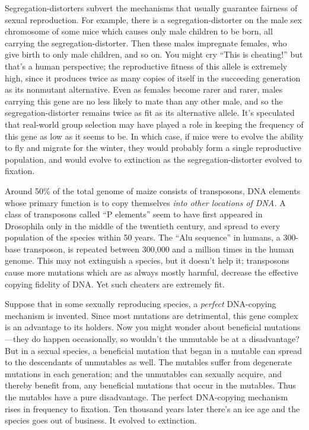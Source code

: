  Segregation-distorters subvert the mechanisms that usually
guarantee fairness of sexual reproduction. For example, there is a
segregation-distorter on the male sex chromosome of some mice which
causes only male children to be born, all carrying the
segregation-distorter. Then these males impregnate females, who give
birth to only male children, and so on. You might cry
``This is cheating!'' but
that's a human perspective; the reproductive fitness of
this allele is extremely high, since it produces twice as many copies
of itself in the succeeding generation as its nonmutant alternative.
Even as females become rarer and rarer, males carrying this gene are no
less likely to mate than any other male, and so the
segregation-distorter remains twice as fit as its alternative allele.
It's speculated that real-world group selection may
have played a role in keeping the frequency of this gene as low as it
seems to be. In which case, if mice were to evolve the ability to fly
and migrate for the winter, they would probably form a single
reproductive population, and would evolve to extinction as the
segregation-distorter evolved to fixation.


 Around 50\% of the total genome of maize consists of transposons,
DNA elements whose primary function is to copy themselves \textit{into
other locations of DNA.} A class of transposons called
``P elements'' seem to have first
appeared in Drosophila only in the middle of the twentieth century, and
spread to every population of the species within 50 years. The
``Alu sequence'' in humans, a
300-base transposon, is repeated between 300,000 and a million times in
the human genome. This may not extinguish a species, but it
doesn't help it; transposons cause more mutations which
are as always mostly harmful, decrease the effective copying fidelity
of DNA. Yet such cheaters are extremely fit.


 Suppose that in some sexually reproducing species, a
\textit{perfect} DNA-copying mechanism is invented. Since most
mutations are detrimental, this gene complex is an advantage to its
holders. Now you might wonder about beneficial mutations---they do
happen occasionally, so wouldn't the unmutable be at a
disadvantage? But in a sexual species, a beneficial mutation that began
in a mutable can spread to the descendants of unmutables as well. The
mutables suffer from degenerate mutations in each generation; and the
unmutables can sexually acquire, and thereby benefit from, any
beneficial mutations that occur in the mutables. Thus the mutables have
a pure disadvantage. The perfect DNA-copying mechanism rises in
frequency to fixation. Ten thousand years later there's
an ice age and the species goes out of business. It evolved to
extinction.


